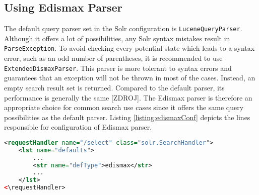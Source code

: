 \subsection{Using Edismax Parser}

The default query parser set in the Solr configuration is \texttt{LuceneQueryParser}. 
Although it offers a lot of possibilities, any Solr syntax mistakes result in \texttt{ParseEx\-ception}. 
To avoid checking every potential state which leads to a syntax error, such as an odd number of parentheses, it is recommended to use \texttt{Extended\-Dismax\-Parser}.
This parser is more tolerant to syntax errors and guarantees that an exception will not be thrown in most of the cases. %
Instead, an empty search result set is returned.
Compared to the default parser, its performance is generally the same [ZDROJ]. %
The Edismax parser is therefore an appropriate choice for common search use cases since it offers the same query possibilities as the default parser. %
Listing \ref{listing:edismaxConf} depicts the lines responsible for configuration of Edismax parser.

\begin{lstlisting}[language=XML, caption={Configuration of the Edismax parser.}, label={listing:edismaxConf}]
<requestHandler name="/select" class="solr.SearchHandler">
	<lst name="defaults">
		...
		<str name="defType">edismax</str>
		...
	</lst>
<\requestHandler>
\end{lstlisting}



%
%
%



